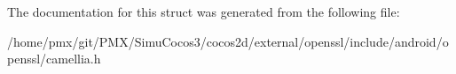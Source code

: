 \begin{DoxyCompactItemize}
\begin{tabbing}
\end{tabbing}\end{DoxyCompactItemize}


The documentation for this struct was generated from the following file\+:\begin{DoxyCompactItemize}
\item 
/home/pmx/git/\+P\+M\+X/\+Simu\+Cocos3/cocos2d/external/openssl/include/android/openssl/camellia.\+h\end{DoxyCompactItemize}
